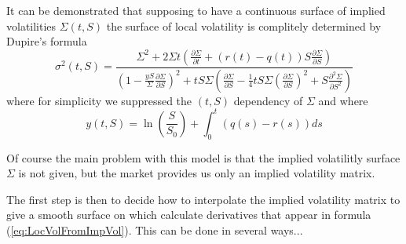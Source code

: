 It can be demonstrated that supposing to have a continuous surface of implied volatilities $\Sigma(t,S)$ the surface of local volatility is complitely determined by Dupire's formula
\begin{equation}\label{eq:LocVolFromImpVol}
\sigma^2(t, S) = \frac{ \Sigma^2 + 2\Sigma t (\frac{\partial\Sigma}{\partial t} + (r(t) - q(t))S\frac{\partial\Sigma}{\partial S} ) }{ \left( 1- \frac{yS}{\Sigma} \frac{\partial\Sigma}{\partial S} \right)^2 + tS\Sigma\left( \frac{\partial\Sigma}{\partial S} - \frac{1}{4} tS\Sigma \left(\frac{\partial\Sigma}{\partial S}\right)^2 + S\frac{\partial^2\Sigma}{\partial S^2} \right) }
\end{equation}
where for simplicity we suppressed the $(t,S)$ dependency of $\Sigma$ and where
\begin{equation}
y(t,S) = \ln\left( \frac{S}{S_0} \right) + \int_{0}^t(q(s) - r(s))ds
\end{equation}

Of course the main problem with this model is that the implied volatilitly surface $\Sigma$ is not given, but the market provides us only an implied volatility matrix.

The first step is then to decide how to interpolate the implied volatility matrix to give a smooth surface on which calculate derivatives that appear in formula (\ref{eq:LocVolFromImpVol}). This can be done in several ways...








